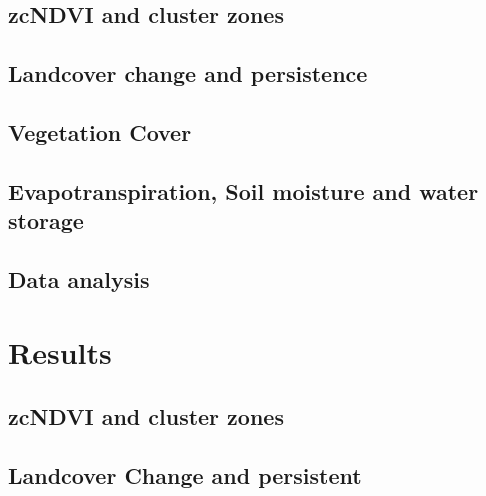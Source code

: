 \documentclass[preprint,
3p]{elsarticle} %
\begin{document}
\hypertarget{zcndvi-and-cluster-zones}{%
\subsection{zcNDVI and cluster zones}\label{zcndvi-and-cluster-zones}}

\hypertarget{landcover-change-and-persistence}{%
\subsection{Landcover change and
persistence}\label{landcover-change-and-persistence}}

\hypertarget{vegetation-cover}{%
\subsection{Vegetation Cover}\label{vegetation-cover}}

\hypertarget{evapotranspiration-soil-moisture-and-water-storage}{%
\subsection{Evapotranspiration, Soil moisture and water
storage}\label{evapotranspiration-soil-moisture-and-water-storage}}

\hypertarget{data-analysis}{%
\subsection{Data analysis}\label{data-analysis}}

\hypertarget{results}{%
\section{Results}\label{results}}

\hypertarget{zcndvi-and-cluster-zones-1}{%
\subsection{zcNDVI and cluster zones}\label{zcndvi-and-cluster-zones-1}}

\hypertarget{landcover-change-and-persistent}{%
\subsection{Landcover Change and
persistent}\label{landcover-change-and-persistent}}
\end{document}
